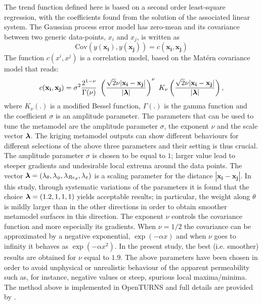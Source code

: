 The trend function defined  here is  based on a second order least-square regression, with the coefficients found from 
the solution of the associated linear system.
\newpage
The Gaussian process error model has zero-mean and its covariance between two generic data-points, $x_i$ and $x_j$, is written as 
$$
\textrm{Cov}(y(\mathbf{x_i}), y(\mathbf{x_j})) = c(\mathbf{x_i}, \mathbf{x_j})
$$
The function $c(x^i, x^j)$ is a correlation model, based on the Mat\'ern covariance model that reads:
\begin{equation}
c(\mathbf{x_i}, \mathbf{x_j}) = \sigma^2 \dfrac{2^{1- \nu}}{\Gamma(\nu)} \  \left( \dfrac{\sqrt{2} \nu |\mathbf{x_i} - \mathbf{x_j}|}{|\bs{\lambda}|} \right)^{\nu} \ K_{\nu}\left( \dfrac{\sqrt{2} \nu |\mathbf{x_i} - \mathbf{x_j}|}{|\bs{\lambda}|} \right),
\label{eq:matern}
\end{equation}
where $K_{\nu}(.)$ is a modified Bessel function, $\Gamma(.)$ is the gamma function and the coefficient $\sigma$ is an amplitude parameter.
The parameters that can be used to tune the metamodel are the amplitude parameter $\sigma$, the exponent $\nu$ and the scale vector $\boldsymbol{\lambda}$.
The kriging metamodel outputs can show different behaviours for different selections of the above three parameters and their setting is thus crucial. 
The amplitude parameter $\sigma$ is chosen to be equal to $1$; larger value lead to steeper gradients and undesirable local extrema around the data points.
The vector $\boldsymbol{\lambda}=(\lambda_{\theta}, \lambda_{\phi}, \lambda_{Re_d}, \lambda_{\varepsilon} )$ is a scaling parameter for the distance $ |\mathbf{x_i} - \mathbf{x_j}|$.
In this study, through systematic variations of the parameters it is found that  the choice $\boldsymbol{\lambda}=(1.2, 1, 1, 1)$ yields acceptable results; in particular, the weight along $\theta$ 
is mildly larger than in the other directions in order to obtain smoother metamodel surfaces in this direction.
The exponent $\nu$ controls the  covariance function and more especially its gradients. 
When  $\nu = 1/2$ the covariance can be approximated by a negative exponential, $\exp(-\alpha x)$  and  when $\nu$ goes to infinity it behaves as $\exp(-\alpha x^2)$.
In the present study, the best (i.e. smoother) results are obtained for $\nu$ equal to $1.9$.
The above parameters have been chosen in order to avoid unphysical or unrealistic  behaviour of the apparent permeability such as, for instance,  negative values or 
steep, spurious local maxima/minima.
The method above is implemented in OpenTURNS and full details are provided by \citet{openturns}. 


